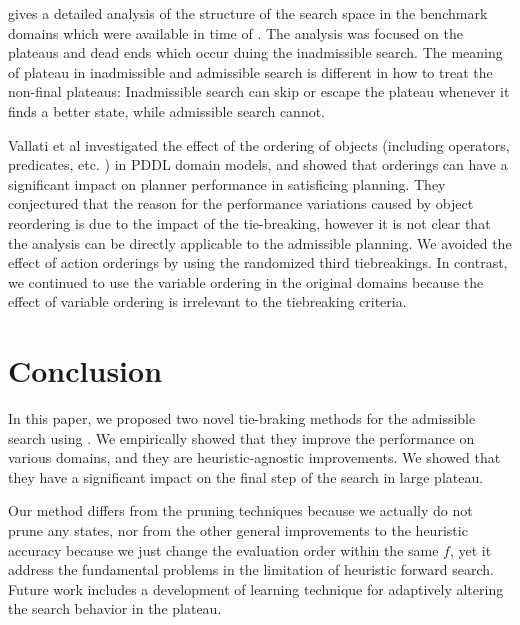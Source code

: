 \citeauthor{Hoffmann05} gives a detailed analysis of the
structure of the search space in the benchmark domains which were
available in time of \citeyear{Hoffmann05}
\cite{Hoffmann05,Hoffmann14}. 
The analysis was focused on the plateaus and dead ends which occur duing the inadmissible search.
The meaning of plateau in inadmissible and admissible search is
different in how to treat the non-final plateaus: Inadmissible search can
skip or escape the plateau whenever it finds a better state, while
admissible search cannot.

Vallati et al  investigated the effect
of the ordering of objects (including operators, predicates, etc. ) in
PDDL domain models, and showed that orderings can have a significant
impact on planner performance in satisficing planning.
They conjectured that the reason for the performance variations caused
by object reordering is due to the impact of the tie-breaking,
however it is not clear that the analysis can be
directly applicable to the admissible planning.
We avoided the effect of action orderings by using the randomized third
tiebreakings.
In contrast, we continued to use the variable ordering in the original domains
because the effect of variable ordering is irrelevant to the tiebreaking
criteria.

\section{Conclusion}

In this paper, we proposed two novel tie-braking methods for the admissible search using \astar. We empirically showed that they improve the performance on various domains, and they are heuristic-agnostic improvements. We showed that they have a significant impact on the final step of the search in large plateau.

Our method differs from the pruning techniques because we actually
do not prune any states, nor from the other general improvements to the
heuristic accuracy because we just change the evaluation order within the
same $f$, yet it address the fundamental problems in the limitation of
heuristic forward search.  Future work includes a development of learning
technique for adaptively altering the search behavior in the plateau.



